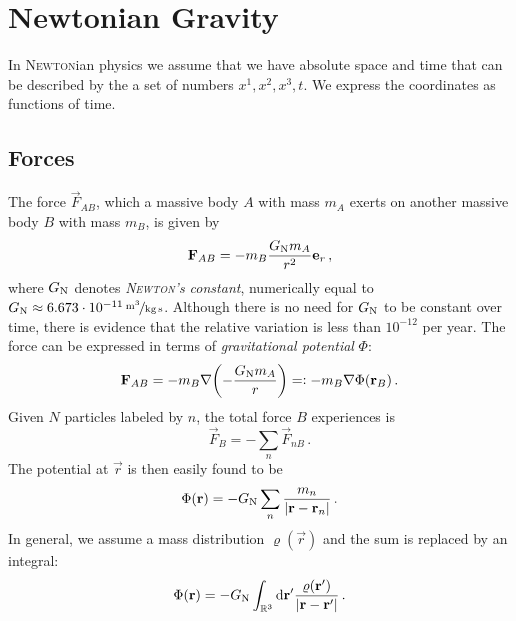 \chapter{Newtonian Gravity}
In \textsc{Newton}ian physics we assume that we have absolute space and time
that can be described by the a set of numbers $x^1,x^2,x^3,t$.
We express the coordinates as functions of time.
\section{Forces}
The force $\vec{F}_{AB}$, which a massive body $A$ with mass $m_A$ exerts on another massive body $B$ with mass $m_B$, is given by
\begin{equation}
    \vec{F}_{AB}=-m_B\frac{G\textsubscript{N}m_A}{r^2}\vec{e}_r\, ,
\end{equation}
where $G\textsubscript{N}$ denotes \emph{\textsc{Newton}'s constant},
numerically equal to $G\textsubscript{N}\approx \unitfrac[6.673\cdot 10^{-11}]{m^3}{kg\,s}$.
Although there is no need for $G\textsubscript{N}$ to be constant over time,
there is evidence that the relative variation is less than $10^{-12}$ per year.
The force can be expressed in terms of \emph{gravitational potential} $\Phi$:
\begin{equation}
    \vec{F}_{AB}=-m_B\nabla\left(-\frac{G\textsubscript{N}m_A}{r}\right)=:
    -m_B\nabla\Phi(\vec{r}_B)\, .
\end{equation}
Given $N$ particles labeled by $n$, the total force $B$ experiences is
\begin{equation}
    \vec{F}_{B}=-\sum_n \vec{F}_{nB}\, .
\end{equation}
The potential at $\vec{r}$ is then easily found to be
\begin{equation}
    \Phi(\vec{r})=-G\textsubscript{N}\sum_n\frac{m_n}{|\vec{r}-\vec{r}_n|}\, .
\end{equation}
In general, we assume a mass distribution $\varrho(\vec{r})$ and the sum is
replaced by an integral:
\begin{equation}
    \Phi(\vec{r}) = -G\textsubscript{N}\int_{\Reals^3}\dif{\vec{r}^{\prime}}
    \frac{\varrho(\vec{r}^{\prime})}{|\vec{r}-\vec{r}^{\prime}|}\,.
\end{equation}
